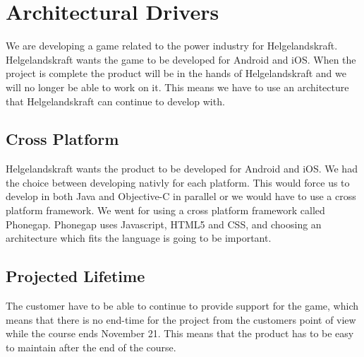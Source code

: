 \section{Architectural Drivers}
We are developing a game related to the power industry for Helgelandskraft. Helgelandskraft 
wants the game to be developed for Android and iOS. When the project is complete the product 
will be in the hands of Helgelandskraft and we will no longer be able to work on it. This means 
we have to use an architecture that Helgelandskraft can continue to develop with.

\subsection*{Cross Platform}
Helgelandskraft wants the product to be developed for Android and iOS. We had the choice between 
developing nativly for each platform. This would force us to develop in both Java and Objective-C 
in parallel or we would have to use a cross platform framework. We went for using a cross platform 
framework called Phonegap. Phonegap uses Javascript, HTML5 and CSS, and choosing an architecture 
which fits the language is going to be important.

\subsection*{Projected Lifetime}
The customer have to be able to continue to provide support for the game, which means that there is 
no end-time for the project from the customers point of view while the course ends November 21. 
This means that the product has to be easy to maintain after the end of the course.

